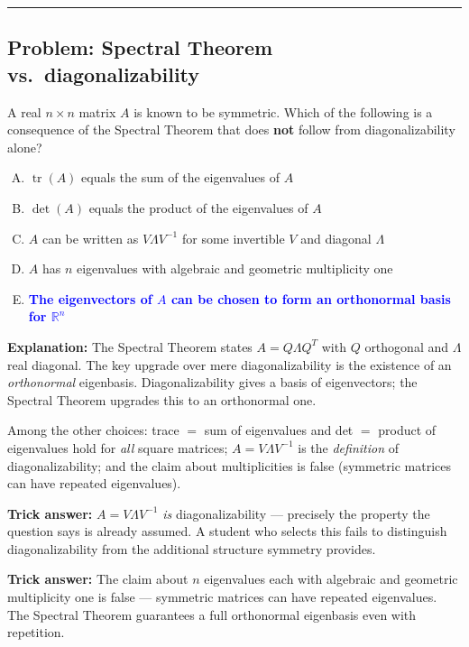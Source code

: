 \documentclass[12pt]{amsart}
\newcommand{\divider}{
  \vspace{-1em}
  \noindent
  \raisebox{-0.15ex}{\textbullet}%
  \hspace{0.5em}%
  \rule[0.5ex]{0.95\textwidth}{1.0pt}%
  \hspace{0.5em}%
  \raisebox{-0.15ex}{\textbullet}%
  \vspace{0em}
}
\begin{document}
\divider

\subsection*{Problem: Spectral Theorem vs.\ diagonalizability}

A real $n \times n$ matrix $A$ is known to be symmetric.
Which of the following is a consequence of the Spectral Theorem that does
\textbf{not} follow from diagonalizability alone?

\begin{enumerate}[(A)]
\item $\operatorname{tr}(A)$ equals the sum of the eigenvalues of $A$
\item $\det(A)$ equals the product of the eigenvalues of $A$
\item $A$ can be written as $V\Lambda V^{-1}$ for some invertible $V$
      and diagonal $\Lambda$
\item $A$ has $n$ eigenvalues with algebraic and geometric multiplicity one
\item \textcolor{blue}{\textbf{The eigenvectors of $A$ can be chosen to
      form an orthonormal basis for $\mathbb{R}^n$}}
\end{enumerate}

\textbf{Explanation:}
The Spectral Theorem states $A = Q\Lambda Q^T$ with $Q$ orthogonal and
$\Lambda$ real diagonal. The key upgrade over mere diagonalizability is
the existence of an \emph{orthonormal} eigenbasis. Diagonalizability
gives a basis of eigenvectors; the Spectral Theorem upgrades this to an
orthonormal one.

Among the other choices:
trace $=$ sum of eigenvalues and det $=$ product of eigenvalues hold for
\emph{all} square matrices; $A = V\Lambda V^{-1}$ is the
\emph{definition} of diagonalizability; and the claim about multiplicities
is false (symmetric matrices can have repeated eigenvalues).

\textbf{Trick answer:}
$A = V\Lambda V^{-1}$ \emph{is} diagonalizability --- precisely the
property the question says is already assumed. A student who selects this
fails to distinguish diagonalizability from the additional structure
symmetry provides.

\textbf{Trick answer:}
The claim about $n$ eigenvalues each with algebraic and geometric
multiplicity one is false --- symmetric matrices can have repeated
eigenvalues. The Spectral Theorem guarantees a full orthonormal
eigenbasis even with repetition.
\end{document}
